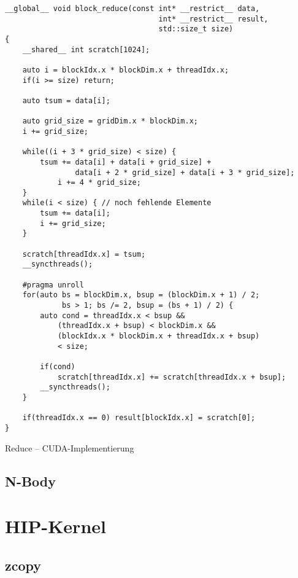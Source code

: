 \begin{code}
    \begin{verbatim}
__global__ void block_reduce(const int* __restrict__ data,
                                   int* __restrict__ result,
                                   std::size_t size)
{
    __shared__ int scratch[1024]; 

    auto i = blockIdx.x * blockDim.x + threadIdx.x;
    if(i >= size) return;

    auto tsum = data[i];

    auto grid_size = gridDim.x * blockDim.x;
    i += grid_size;

    while((i + 3 * grid_size) < size) {
        tsum += data[i] + data[i + grid_size] +
                data[i + 2 * grid_size] + data[i + 3 * grid_size];
            i += 4 * grid_size;
    }
    while(i < size) { // noch fehlende Elemente
        tsum += data[i];
        i += grid_size;
    }

    scratch[threadIdx.x] = tsum;
    __syncthreads();

    #pragma unroll
    for(auto bs = blockDim.x, bsup = (blockDim.x + 1) / 2;
             bs > 1; bs /= 2, bsup = (bs + 1) / 2) {
        auto cond = threadIdx.x < bsup &&
            (threadIdx.x + bsup) < blockDim.x &&
            (blockIdx.x * blockDim.x + threadIdx.x + bsup)
            < size;

        if(cond)
            scratch[threadIdx.x] += scratch[threadIdx.x + bsup];
        __syncthreads();
    }

    if(threadIdx.x == 0) result[blockIdx.x] = scratch[0];
}
    \end{verbatim}
    \caption{Reduce -- CUDA-Implementierung}
    \label{anhang:cuda:reduction}
\end{code}

\subsection{N-Body}

\section{HIP-Kernel}

\subsection{zcopy}

